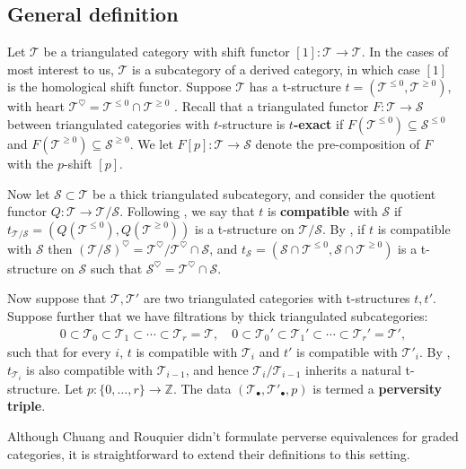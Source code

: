 \documentclass[11pt,reqno]{amsart}
\numberwithin{equation}{section}
\theoremstyle{definition}
\theoremstyle{named}
\newcommand{\cS}{\mathcal{S}}
\newcommand{\cT}{\mathcal{T}}
\newcommand{\ZZ}{\mathbb{Z}}
\begin{document}
\subsection{General definition}\label{sec:pervdef}
Let $\cT$ be a triangulated category with shift functor $[1]:\cT \rightarrow \cT$. In the cases of most interest to us, $\cT$ is a subcategory of a derived category, in which case $[1]$ is the homological shift functor.
Suppose $\cT$ has a t-structure $t=(\cT^{\leq0},\cT^{\geq0})$, with heart $\cT^\heartsuit=\cT^{\leq0} \cap \cT^{\geq0}$ \cite{BBD}.  Recall that a triangulated functor $F:\cT \to \cS$ between triangulated categories with $t$-structure is \textbf{$t$-exact} if $F(\cT^{\leq0})\subseteq \cS^{\leq0}$ and $F(\cT^{\geq0})\subseteq \cS^{\geq0}$.  We let $F[p]: \cT \to \cS$ denote the pre-composition of $F$ with the $p$-shift $[p]$.


Now let $\cS \subset \cT$ be a thick triangulated subcategory, and consider the quotient functor $Q:\cT \to \cT/\cS$.  Following \cite{CRperv}, we say that $t$ is \textbf{compatible} with $\cS$ if $t_{\cT/\cS}=(Q(\cT^{\leq0}),Q(\cT^{\geq0}))$ is a t-structure on $\cT/\cS$.  By \cite[Lemmas 3.3 \& 3.9]{CRperv}, if $t$ is compatible with $\cS$ then $(\cT/\cS)^\heartsuit=\cT^\heartsuit/\cT^\heartsuit\cap \cS$, and  $t_\cS=(\cS\cap\cT^{\leq0},\cS\cap\cT^{\geq0})$ is a t-structure on $\cS$ such that $\cS^\heartsuit=\cT^\heartsuit\cap \cS$.

Now suppose that $\cT,\cT'$ are two triangulated categories with t-structures $t,t'$.  Suppose further that we have filtrations by thick triangulated subcategories:
\begin{align*}
0 \subset \cT_0 \subset \cT_1\subset \cdots\subset \cT_r=\cT ,\quad 0 \subset \cT_0' \subset \cT_1'\subset \cdots\subset \cT_r'=\cT', 
\end{align*}
such that for every $i$, $t$ is compatible with $\cT_i$ and $t'$ is compatible with $\cT'_i$. By \cite[Lemma 3.11]{CRperv}, $t_{\cT_i}$ is also compatible with $\cT_{i-1}$, and hence $\cT_i/\cT_{i-1}$ inherits a natural t-structure.  Let $p: \{0,\hdots,r\} \rightarrow \ZZ$.  The data $(\cT_\bullet, \cT'_\bullet, p)$ is termed a \textbf{perversity triple}.  

Although Chuang and Rouquier didn't formulate perverse equivalences for graded categories, it is straightforward to extend their definitions to this setting.
\end{document}
